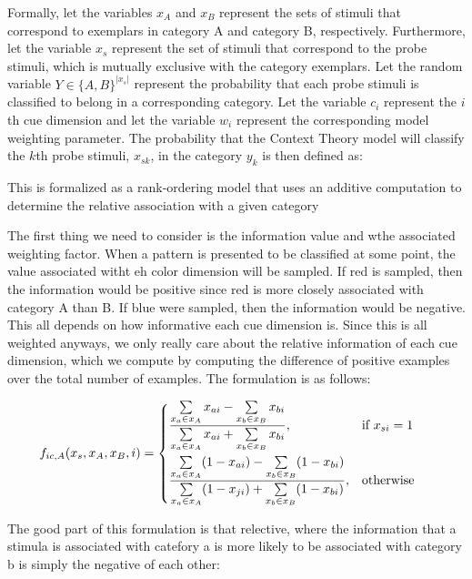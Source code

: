 \documentclass[11pt]{article}
\begin{document}
Formally, let the variables $x_A$ and $x_B$ represent the sets of stimuli that correspond to exemplars in category A and category B, respectively. Furthermore, let the variable $x_s$ represent the set of stimuli that correspond to the probe stimuli, which is mutually exclusive with the category exemplars. Let the random variable $Y \in \{A,B\}^{|x_s|}$ represent the probability that each probe stimuli is classified to belong in a corresponding category. Let the variable $c_i$ represent the $i$th cue dimension and let the variable $w_i$ represent the corresponding model weighting parameter. The probability that the Context Theory model will classify the $k$th probe stimuli, $x_{sk}$, in the category $y_k$ is then defined as:

This is formalized as a rank-ordering model that uses an additive computation to determine the relative association with a given category

The first thing we need to consider is the information value and wthe associated weighting factor. When a pattern is presented to be classified at some point, the value associated witht eh color dimension will be sampled. If red is sampled, then the information would be positive since red is more closely associated with category A than B. If blue were sampled, then the information would be negative. This all depends on how informative each cue dimension is. Since this is all weighted anyways, we only really care about the relative information of each cue dimension, which we compute by computing the difference of positive examples over the total number of examples. The formulation is as follows:

\begin{align}
    f_{ic,A}(x_s, x_A, x_B, i) &= 
        \begin{dcases}
            \frac{\sum\limits_{x_a \in x_A} x_{ai} - \sum\limits_{x_b \in x_B} x_{bi}} {\sum\limits_{x_a \in x_A} x_{ai} + \sum\limits_{x_b \in x_B} x_{bi}}, & \text{if } x_{si} = 1 \\
            \frac{\sum\limits_{x_a \in x_A} (1-x_{ai}) - \sum\limits_{x_b \in x_B} (1-x_{bi})} {\sum\limits_{x_a \in x_A} (1-x_{ji}) + \sum\limits_{x_b \in x_B} (1-x_{bi})}, & \text{otherwise } 
        \end{dcases}
\end{align}

The good part of this formulation is that relective, where the information that a stimula is associated with catefory a is more likely to be associated with category b is simply the negative of each other:
\end{document}
